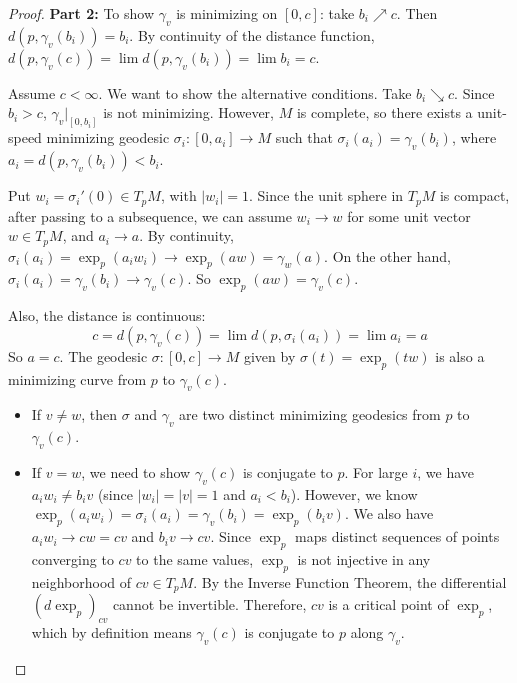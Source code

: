 \documentclass[11pt, a4paper]{article}
\theoremstyle{plain}
\theoremstyle{definition}
\theoremstyle{remark}
\begin{document}
{\begin{proof}
\textbf{Part 2:} To show $\gamma_v$ is minimizing on $[0, c]$: take $b_i \nearrow c$. Then $d(p, \gamma_v(b_i)) = b_i$. By continuity of the distance function, $d(p, \gamma_v(c)) = \lim d(p, \gamma_v(b_i)) = \lim b_i = c$.

Assume $c < \infty$. We want to show the alternative conditions.
Take $b_i \searrow c$. Since $b_i > c$, $\gamma_v|_{[0, b_i]}$ is not minimizing. 
However, $M$ is complete, so there exists a unit-speed minimizing geodesic $\sigma_i : [0, a_i] \to M$ such that $\sigma_i(a_i) = \gamma_v(b_i)$, where $a_i = d(p, \gamma_v(b_i)) < b_i$.

Put $w_i = \sigma_i'(0) \in T_p M$, with $|w_i| = 1$.
Since the unit sphere in $T_pM$ is compact, after passing to a subsequence, we can assume $w_i \to w$ for some unit vector $w \in T_pM$, and $a_i \to a$.
By continuity, $\sigma_i(a_i) = \exp_p(a_i w_i) \to \exp_p(aw) = \gamma_w(a)$.
On the other hand, $\sigma_i(a_i) = \gamma_v(b_i) \to \gamma_v(c)$. So $\exp_p(aw) = \gamma_v(c)$.

Also, the distance is continuous:
\[ c = d(p, \gamma_v(c)) = \lim d(p, \sigma_i(a_i)) = \lim a_i = a \]
So $a = c$. The geodesic $\sigma : [0, c] \to M$ given by $\sigma(t) = \exp_p(tw)$ is also a minimizing curve from $p$ to $\gamma_v(c)$.

\begin{itemize}
    \item If $v \neq w$, then $\sigma$ and $\gamma_v$ are two distinct minimizing geodesics from $p$ to $\gamma_v(c)$.
    
    \item If $v = w$, we need to show $\gamma_v(c)$ is conjugate to $p$. 
    For large $i$, we have $a_i w_i \neq b_i v$ (since $|w_i|=|v|=1$ and $a_i < b_i$).
    However, we know $\exp_p(a_i w_i) = \sigma_i(a_i) = \gamma_v(b_i) = \exp_p(b_i v)$.
    We also have $a_i w_i \to cw = cv$ and $b_i v \to cv$.
    Since $\exp_p$ maps distinct sequences of points converging to $cv$ to the same values, $\exp_p$ is not injective in any neighborhood of $cv \in T_pM$.
    By the Inverse Function Theorem, the differential $(d\exp_p)_{cv}$ cannot be invertible. Therefore, $cv$ is a critical point of $\exp_p$, which by definition means $\gamma_v(c)$ is conjugate to $p$ along $\gamma_v$.
\end{itemize}
\end{proof}
}
\newpage
\end{document}
